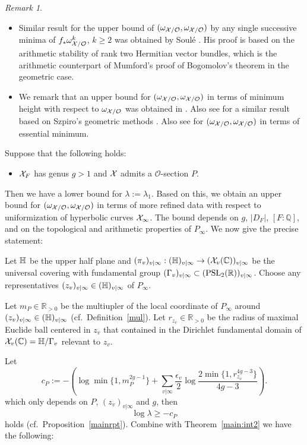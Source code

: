 \documentclass[]{amsart}
\newcommand{\BC}{{\mathbb {C}}} \newcommand{\BD}{{\mathbb {D}}}
\newcommand{\BQ}{{\mathbb {Q}}} \newcommand{\BR}{{\mathbb {R}}}
\newcommand{\CO}{{\mathcal {O}}} \newcommand{\CP}{{\mathcal {P}}}
\newcommand{\ra}{\rightarrow} \newcommand{\imp}{\Longrightarrow}
\theoremstyle{plain}
\theoremstyle{remark} \newtheorem{remark}[thm]{Remark}
\theoremstyle{remark} \newtheorem{exercise}{Exercise}
\theoremstyle{remark} \newtheorem{example}{Example}
\numberwithin{equation}{section}
\begin{document}
 \begin{remark}\
\begin{itemize}
  \item [(i)] Similar result for the upper bound of $(\omega_{\CX/\CO},\omega_{\CX/\CO})$ by any single successive minima of $f_*\omega_{\CX/\CO}^k$, $k\geq 2$ was obtained by Soul\'{e} \cite{Soule:94}. His proof is based on the arithmetic stability of rank two Hermitian vector bundles, which is the arithmetic counterpart of Mumford's proof of Bogomolov's theorem in the geometric case.
  \item [(ii)] We remark that an upper bound for $(\omega_{\CX/\CO},\omega_{\CX/\CO})$ in terms of minimum height with respect to $\omega_{\CX/\CO}$ was obtained in \cite[Thm.~5~b)]{Faltings}. Also see \cite[Thm.5~b)]{Elkik:1985} for a similar result based on Szpiro's geometric methods \cite{Szpiro:1981}. Also see \cite[Thm.6.3]{Zhang:1992} for $(\omega_{\CX/\CO},\omega_{\CX/\CO})$ in terms of essential minimum.
\end{itemize}

\end{remark}
 
Suppose that the following holds: \begin{itemize}
  \item [(A)] ${\mathcal {X}}_F$ has genus $g>1$ and ${\mathcal {X}}$ admits a $\CO$-section $P$.
\end{itemize}Then we have a lower bound for $\lambda:=\lambda_1$. Based on this, we obtain an upper bound for $(\omega_{\CX/\CO},\omega_{\CX/\CO})$ in terms of more refined data with respect to uniformization of hyperbolic curves ${\mathcal {X}}_\infty$. The bound depends on $g$, $|D_F|$, $[F:\BQ]$, and on the topological and arithmetic properties of $P_\infty$. We now give the precise statement: 

Let ${\mathbb {H}}$ be the upper half plane and $(\pi_v)_{v|\infty}:(\BH)_{v|\infty}\ra (\CX_v(\BC))_{v|\infty}$ be the universal covering with fundamental group $(\Gamma_v)_{v|\infty}\subset (\PSL_2(\BR))_{v|\infty}$. Choose any representatives $(z_v)_{v|\infty}\in ({\mathbb {H}})_{v|\infty}$ of $P_\infty$.
 
 Let $m_P\in \BR_{>0}$ be the multiupler of the local coordinate of $P_\infty$ around $(z_v)_{v|\infty}\in ({\mathbb {H}})_{v|\infty}$ (cf.~Definition~\ref{mul}). Let $r_{z_v}\in \BR_{>0}$ be the radius of maximal Euclide ball centered in $z_v$ that contained in the Dirichlet fundamental domain of $\CX_v(\BC)=\BH/\Gamma_v$ relevant to $z_v$.

  Let 
  \[c_P:=-\left(\log\min\{1,m_P^{2g-1}\}+\sum_{v|\infty}\frac{\epsilon_v}{2}\log \frac{2\min\{1,r_{z_v}^{4g-3}\}}{4g-3}\right).\]
 which only depends on $P$, $(z_v)_{v|\infty}$ and $g$, then 
 \[\log \lambda\geq -c_P\] holds (cf.~Proposition~\ref{mainrpt}).
Combine with Theorem~\ref{main:int2} we have the following:
\end{document}
